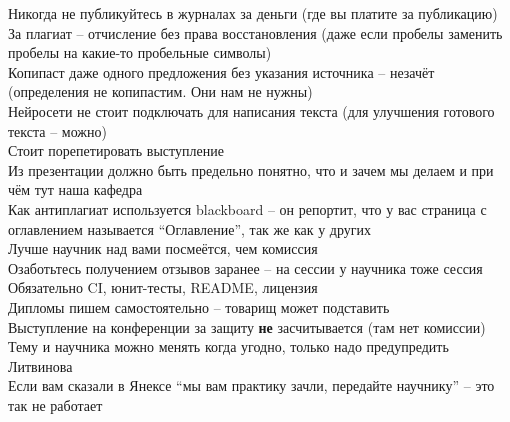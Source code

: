 Никогда не публикуйтесь в журналах за деньги (где вы платите за публикацию) \\
За плагиат -- отчисление без права восстановления (даже если пробелы заменить пробелы на какие-то пробельные символы) \\
Копипаст даже одного предложения без указания источника -- незачёт (определения не копипастим. Они нам не нужны) \\
Нейросети не стоит подключать для написания текста (для улучшения готового текста -- можно) \\
Стоит порепетировать выступление \\
Из презентации должно быть предельно понятно, что и зачем мы делаем и при чём тут наша кафедра \\
Как антиплагиат используется blackboard -- он репортит, что у вас страница с оглавлением называется ``Оглавление'', так же как у других \\
Лучше научник над вами посмеётся, чем комиссия \\
Озаботьтесь получением отзывов заранее -- на сессии у научника тоже сессия \\
Обязательно CI, юнит-тесты, README, лицензия \\
Дипломы пишем самостоятельно -- товарищ может подставить \\
Выступление на конференции за защиту \textbf{не} засчитывается (там нет комиссии) \\
Тему и научника можно менять когда угодно, только надо предупредить Литвинова \\
Если вам сказали в Янексе ``мы вам практику зачли, передайте научнику'' -- это так не работает
